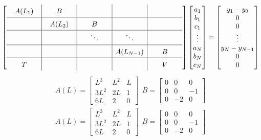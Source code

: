 \documentclass[10pt]{article}
\begin{document}
\begin{multicols*}{2}
{\footnotesize\[\begin{split}
\renewcommand{\arraystretch}{1.5}
\left[ \begin{array}{c|c|c|c|c}
A(L_1) & B & & & \\ \hline
& A(L_2) & B & & \\ \hline
& & \ddots & \ddots & \phantom{A(L_{N-1})} \\ \hline
\phantom{A(L_{N-1})} & \phantom{A(L_{N-1})} & \phantom{A(L_{N-1})} & A(L_{N-1}) & B \\ \hline
T & & & & V
\end{array} \right]
\renewcommand{\arraystretch}{1}
\begin{bmatrix} a_1 \\ b_1 \\ c_1 \\ \vdots \\ a_N \\ b_N \\ c_N \end{bmatrix}
=
\begin{bmatrix} y_1 - y_0 \\ 0 \\ 0 \\ \vdots \\ y_N - y_{N-1} \\ 0 \\ 0 \end{bmatrix}
\end{split}\]}
\[\begin{split}
A(L) = \begin{bmatrix} L^3 & L^2 & L \\ 3L^2 & 2L & 1 \\ 6L & 2 & 0 \end{bmatrix}
\ \
B = \left[ \begin{array}{rrr} 0 & 0 & 0 \\ 0 & 0 & -1 \\ 0 & -2 & 0 \end{array} \right]
\end{split}\]
\[\begin{split}
A(L) = \begin{bmatrix} L^3 & L^2 & L \\ 3L^2 & 2L & 1 \\ 6L & 2 & 0 \end{bmatrix}
\ \
B = \left[ \begin{array}{rrr} 0 & 0 & 0 \\ 0 & 0 & -1 \\ 0 & -2 & 0 \end{array} \right]
\end{split}\]


\end{multicols*}
\end{document}
